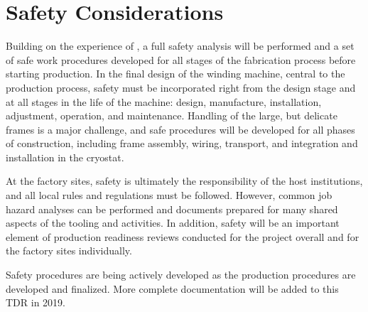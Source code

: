 \section{Safety Considerations}
\label{sec:fdsp-apa-safety}

Building on the experience of , a full safety analysis will be performed and a set of safe work procedures developed for all stages of the fabrication process before starting   production.  In the final design of the winding machine, central to the production process, safety must be incorporated right from the design stage and at all stages in the life of the machine: design, manufacture, installation, adjustment, operation, and maintenance.  Handling of the large, but delicate frames is a major challenge, and safe procedures will be developed for all phases of construction, including frame assembly, wiring, transport, and integration and installation in the cryostat.         

At the factory sites, safety is ultimately the responsibility of the host institutions, and all local rules and regulations must be followed.  However, common job hazard analyses can be performed and documents prepared for many shared aspects of the tooling and activities.  In addition, safety will be an important element of production readiness reviews conducted for the project overall and for the factory sites individually.   

Safety procedures are being actively developed as the production procedures are developed and finalized.  More complete documentation will be added to this TDR in 2019.  